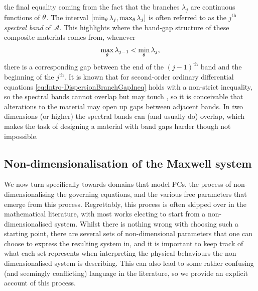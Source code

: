 the final equality coming from the fact that the branches $\lambda_j$ are continuous functions of $\theta$.
The interval $\left[  \min_{\theta}\lambda_j, \max_{\theta}\lambda_j  \right]$ is often referred to as the $j^{\text{th}}$ \emph{spectral band} of $\mathcal{A}$.
This highlights where the band-gap structure of these composite materials comes from, whenever 
\begin{align} \label{eq:Intro-DispersionBranchGapIneq}
	\max_{\theta}\lambda_{j-1} < \min_{\theta}\lambda_{j},
\end{align}
there is a corresponding gap between the end of the $(j-1)^{\text{th}}$ band and the beginning of the $j^{\text{th}}$.
It is known that for second-order ordinary differential equations \eqref{eq:Intro-DispersionBranchGapIneq} holds with a non-strict inequality, so the spectral bands cannot overlap but may touch \cite[chapter XIII]{reed1978iv}, so it is conceivable that alterations to the material may open up gaps between adjacent bands.
In two dimensions (or higher) the spectral bands can (and usually do) overlap, which makes the task of designing a material with band gaps harder though not impossible.

\subsection{Non-dimensionalisation of the Maxwell system} \label{ssec:Intro-NonDimMax}
We now turn specifically towards domains that model PCs, the process of non-dimensionalising the governing equations, and the various free parameters that emerge from this process.
Regrettably, this process is often skipped over in the mathematical literature, with most works electing to start from a non-dimensionalised system.
Whilst there is nothing wrong with choosing such a starting point, there are several sets of non-dimensional parameters that one can choose to express the resulting system in, and it is important to keep track of what each set represents when interpreting the physical behaviours the non-dimensionalised system is describing.
This can also lead to some rather confusing (and seemingly conflicting) language in the literature, so we provide an explicit account of this process.

